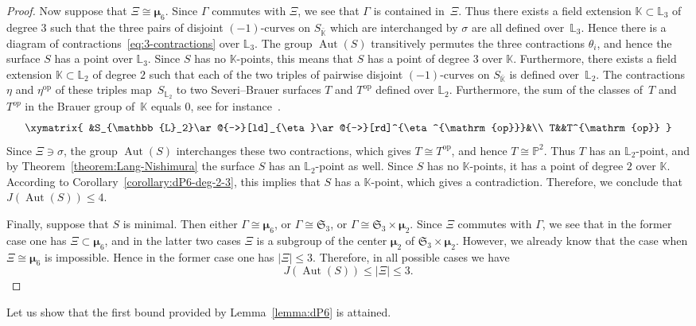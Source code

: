 \documentclass[12pt]{amsart}
\theoremstyle{definition}
\theoremstyle{remark}
\newcommand{\PP}{\mathbb{P}}
\newcommand{\KK}{\mathbb{K}}
\newcommand{\LL}{\mathbb{L}}
\newcommand{\SSS}{\mathfrak{S}}
\newcommand{\mumu}{{\boldsymbol{\mu}}}
\newcommand{\Aut}{\operatorname{Aut}}
\def \le {\leqslant}
\begin{document}
\begin{proof}
Now suppose that $\Xi\cong\mumu_6$. Since $\Gamma$ commutes with $\Xi$, we see that $\Gamma$ is contained in~$\Xi$.
Thus there exists a field extension $\KK\subset\LL_3$ of degree $3$ such that the three
pairs of disjoint $(-1)$-curves on $S_{\bar{\KK}}$ which are interchanged by $\sigma$ are all
defined over~$\LL_3$. Hence there is a diagram of contractions~\eqref{eq:3-contractions} over $\LL_3$.
The group $\Aut(S)$ transitively permutes the three contractions $\theta_i$, and hence the surface $S$ has a point over $\LL_3$.
Since $S$ has no $\KK$-points, this means that $S$ has a point of degree $3$ over $\KK$.
Furthermore,  there exists a field extension $\KK\subset\LL_2$ of degree $2$ such that each of the two
triples of pairwise disjoint $(-1)$-curves on $S_{\bar{\KK}}$ is
defined over~$\LL_2$. The contractions $\eta$ and $\eta^{\mathrm{op}}$ of these triples map~$S_{\LL_2}$ to two Severi--Brauer surfaces
$T$ and $T^{\mathrm{op}}$ defined over $\LL_2$. Furthermore, the sum of the classes of~$T$ and~$T^{op}$ in the Brauer group of~$\KK$
equals $0$, see for instance~\mbox{\cite[Lemma~3.1(c)]{IskovskikhTregub}}.
$$
\xymatrix{
&S_{\LL_2}\ar@{->}[ld]_{\eta}\ar@{->}[rd]^{\eta^{\mathrm{op}}}&\\
T&&T^{\mathrm{op}}
}
$$
Since $\Xi\ni\sigma$, the group $\Aut(S)$ interchanges these two contractions, which gives $T\cong T^{\mathrm{op}}$, and hence
$T\cong\PP^2$. Thus $T$ has an $\LL_2$-point, and by Theorem~\ref{theorem:Lang-Nishimura} the surface $S$ has an $\LL_2$-point as well.
Since $S$ has no $\KK$-points, it has a point of degree $2$ over $\KK$.
According to Corollary~\ref{corollary:dP6-deg-2-3}, this implies that $S$ has a $\KK$-point, which gives a contradiction.
Therefore, we conclude that $J(\Aut(S))\le 4$.


Finally, suppose that $S$ is minimal. Then either $\Gamma\cong\mumu_6$, or $\Gamma\cong\SSS_3$, or $\Gamma\cong\SSS_3\times\mumu_2$.
Since $\Xi$ commutes with $\Gamma$, we see that in the former case one has $\Xi\subset\mumu_6$, and in the latter two cases
$\Xi$ is a subgroup of the center $\mumu_2$ of $\SSS_3\times\mumu_2$. However, we already know that the case when $\Xi\cong\mumu_6$ is impossible.
Hence in the former case one has $|\Xi|\le 3$. Therefore, in all possible cases we have
$$
J(\Aut(S))\le |\Xi|\le 3.
$$
\end{proof}

Let us show that the first bound provided by Lemma~\ref{lemma:dP6}
is attained.
\end{document}

